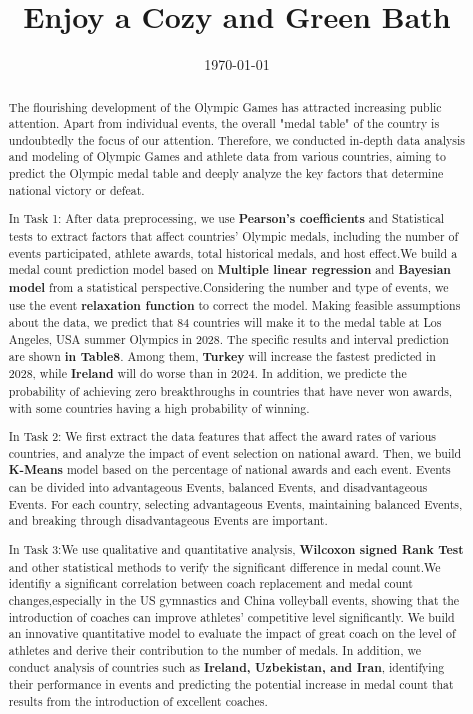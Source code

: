 \documentclass{mcmthesis}
\title{Enjoy a Cozy and Green Bath}
\date{\today}
\begin{document}
\begin{abstract}

The flourishing development of the Olympic Games has attracted increasing public attention. Apart from individual events, the overall "medal table" of the country is undoubtedly the focus of our attention. Therefore, we conducted in-depth data analysis and modeling of Olympic Games and athlete data from various countries, aiming to predict the Olympic medal table and deeply analyze the key factors that determine national victory or defeat.

In Task 1: After data preprocessing, we use \textbf{Pearson's coefficients} and Statistical tests to extract factors that affect countries' Olympic medals, including the number of events participated, athlete awards, total historical medals, and host effect.We build a medal count prediction model based on \textbf{Multiple linear regression} and \textbf{Bayesian model} from a statistical perspective.Considering the number and type of events, we use the event \textbf{relaxation function} to correct the model. Making feasible assumptions about the data, we predict that 84 countries will make it to the medal table at Los Angeles, USA summer Olympics in 2028. The specific results and interval prediction are shown \textbf{in Table8}. Among them, \textbf{Turkey} will increase the fastest predicted in 2028, while \textbf{Ireland} will do worse than in 2024. In addition, we predicte the probability of achieving zero breakthroughs in countries that have never won awards, with some countries having a high probability of winning.

In Task 2: We first extract the data features that affect the award rates of various countries, and analyze the impact of event selection on national award. Then, we build \textbf{K-Means} model based on the percentage of national awards and each event. Events can be divided into advantageous Events, balanced Events, and disadvantageous Events. For each country, selecting advantageous Events, maintaining balanced Events, and breaking through disadvantageous Events are important.

In Task 3:We use qualitative and quantitative analysis, \textbf{Wilcoxon signed Rank Test} and other statistical methods to verify the significant difference in medal count.We identifiy a significant correlation between coach replacement and medal count changes,especially in the US gymnastics and China volleyball events, showing that the introduction of coaches can improve athletes' competitive level significantly. We build an innovative quantitative model to evaluate the impact of great coach on the level of athletes and derive their contribution to the number of medals. In addition, we conduct analysis of countries such as \textbf{Ireland, Uzbekistan, and Iran}, identifying their performance in events and predicting the potential increase in medal count that results from the introduction of excellent coaches.


\end{abstract}
\end{document}
